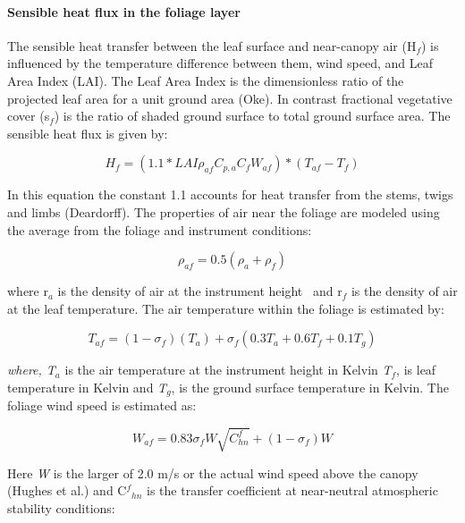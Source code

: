 \paragraph{Sensible heat flux in the foliage layer}\label{sensible-heat-flux-in-the-foliage-layer}

The sensible heat transfer between the leaf surface and near-canopy air (H\(_{f}\)) is influenced by the temperature difference between them, wind speed, and Leaf Area Index (LAI). The Leaf Area Index is the dimensionless ratio of the projected leaf area for a unit ground area (Oke). In contrast fractional vegetative cover (s\(_{f}\)) is the ratio of shaded ground surface to total ground surface area. The sensible heat flux is given by:

\begin{equation}
{H_f} = (1.1*LAI{\rho_{af}}{C_{p,a}}{C_f}{W_{af}})*({T_{af}} - {T_f})
\end{equation}

In this equation the constant 1.1 accounts for heat transfer from the stems, twigs and limbs (Deardorff). The properties of air near the foliage are modeled using the average from the foliage and instrument conditions:

\begin{equation}
{\rho_{af}} = 0.5({\rho_a} + {\rho_f})
\end{equation}

where r\(_{a}\) is the density of air at the instrument height ~and r\(_{f}\) is the density of air at the leaf temperature. The air temperature within the foliage is estimated by:

\begin{equation}
{T_{af}} = (1 - {\sigma_f})({T_a}) + {\sigma_f}\left( {0.3{T_a} + 0.6{T_f} + 0.1{T_g}} \right)
\end{equation}

\emph{where, T\(_{a}\)} is the air temperature at the instrument height in Kelvin \emph{T\(_{f}\)}, is leaf temperature in Kelvin and \emph{T\(_{g}\)}, is the ground surface temperature in Kelvin. The foliage wind speed is estimated as:

\begin{equation}
{W_{af}} = 0.83{\sigma_f}W\sqrt {C_{hn}^f}  + (1 - {\sigma_f})W
\end{equation}

Here \emph{W} is the larger of 2.0 m/s or the actual wind speed above the canopy (Hughes et al.) and C\(^{f}\)\(_{hn}\) is the transfer coefficient at near-neutral atmospheric stability conditions:

